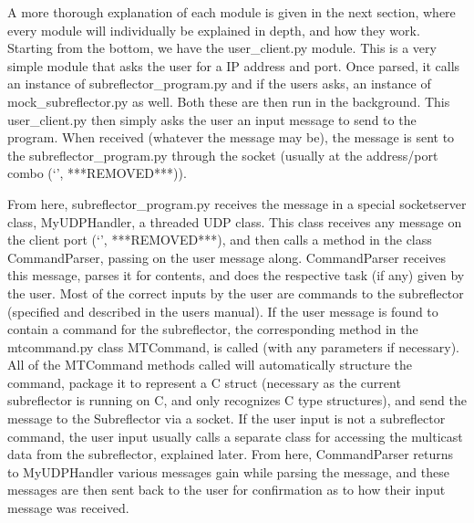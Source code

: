 \documentclass{article}
\begin{document}
 \vspace{10pt}
A more thorough explanation of each module is given in the next section, where every module will individually be explained in depth, and how they work. Starting from the bottom, we have the user\_client.py module. This is a very simple module that asks the user for a IP address and port. Once parsed, it calls an instance of subreflector\_program.py  and if the users asks, an instance of mock\_subreflector.py as well. Both these are then run in the background. This user\_client.py then simply asks the user an input message to send to the program. When received (whatever the message may be), the message is sent to the subreflector\_program.py through the socket (usually at the address/port combo (`', ***REMOVED***)).

 \vspace{10pt}

From here, subreflector\_program.py receives the message in a special socketserver class, MyUDPHandler, a threaded UDP class. This class receives any message on the client port (`', ***REMOVED***), and then calls  a method in the class CommandParser, passing on the user message along. CommandParser receives this message, parses it for contents, and does the respective task (if any) given by the user. Most of the correct inputs by the user are commands to the subreflector (specified and described in the users manual). If the user message is found to contain a command for the subreflector, the corresponding method in the mtcommand.py class MTCommand, is called (with any parameters if necessary).  All of the MTCommand methods called will automatically structure the command, package it to represent a C struct (necessary as the current subreflector is running on C, and only recognizes C type structures),  and send the message to the Subreflector via a socket. If the user input is not a subreflector command, the user input usually calls a separate class for accessing the multicast data from the subreflector, explained later. From here, CommandParser returns to MyUDPHandler various messages gain while parsing the message, and these messages are then sent back to the user for confirmation as to how their input message was received. 

 \vspace{10pt}
 
\end{document}
